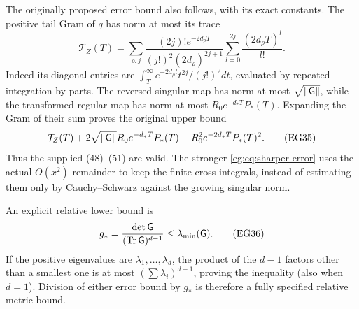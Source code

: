 \documentclass[11pt]{article}
\begin{document}
The originally proposed error bound also follows, with its exact
constants. The positive tail Gram of $q$ has norm at most its trace
\[
 \mathcal T_Z(T)=\sum_{\rho,j}
 \frac{(2j)!e^{-2d_\rho T}}{(j!)^2(2d_\rho)^{2j+1}}
              \sum_{l=0}^{2j}\frac{(2d_\rho T)^l}{l!}.
 \tag{EG34}\label{eg:eq:old-tail}
\]
Indeed its diagonal entries are
$\int_T^\infty e^{-2d_\rho t}t^{2j}/(j!)^2dt$, evaluated by repeated
integration by parts. The reversed singular map has norm at most
$\sqrt{\|\mathsf G\|}$, while the transformed regular map has norm at most
$R_0e^{-d_*T}P_*(T)$. Expanding the Gram of their sum proves the
original upper bound
\[
 \mathcal T_Z(T)+2\sqrt{\|\mathsf G\|}R_0e^{-d_*T}P_*(T)
                      +R_0^2e^{-2d_*T}P_*(T)^2.
 \tag{EG35}\label{eg:eq:old-error}
\]
Thus the supplied (48)--(51) are valid. The stronger
\eqref{eg:eq:sharper-error} uses the actual $O(x^2)$ remainder to keep
the finite cross integrals, instead of estimating them only by
Cauchy--Schwarz against the growing singular norm.

An explicit relative lower bound is
\[
 g_* =\frac{\det\mathsf G}{(\operatorname{Tr}\mathsf G)^{d-1}}\le\lambda_{\min}(\mathsf G).
 \tag{EG36}\label{eg:eq:gstar}
\]
If the positive eigenvalues are $\lambda_1,\ldots,\lambda_d$, the
product of the $d-1$ factors other than a smallest one is at most
$(\sum\lambda_i)^{d-1}$, proving the inequality (also when $d=1$).
Division of either error bound by $g_*$ is therefore a fully
specified relative metric bound.
\end{document}
